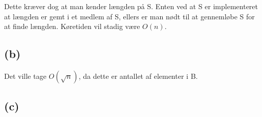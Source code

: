 \documentclass[12pt, a4paper, hidelinks]{article}
\begin{document}
Dette kræver dog at man kender længden på S. Enten ved at S er implementeret at længden er gemt i et medlem af S, ellers er man nødt til at gennemløbe S for at finde længden. Køretiden vil stadig være $O(n)$. 

\subsection{(b)}

Det ville tage $O(\sqrt{n})$, da dette er antallet af elementer i B. 

\subsection{(c)}




















\end{document}
